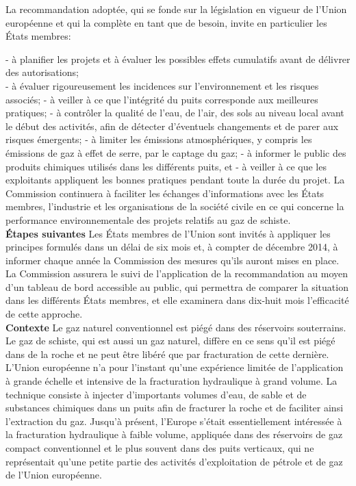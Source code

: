 \documentclass[8pt]{article}
\begin{document}
La recommandation adoptée, qui se fonde sur la législation en vigueur de l’Union européenne et qui la complète en tant que de besoin, invite en particulier les États membres: 

- à planifier les projets et à évaluer les possibles effets cumulatifs avant de délivrer des autorisations;\\
- à évaluer rigoureusement les incidences sur l’environnement et les risques associés;
- à veiller à ce que l’intégrité du puits corresponde aux meilleures pratiques;
- à contrôler la qualité de l’eau, de l’air, des sols au niveau local avant le début des activités, afin de détecter d'éventuels changements et de parer aux risques émergents;
- à limiter les émissions atmosphériques, y compris les émissions de gaz à effet de serre, par le captage du gaz;
- à informer le public des produits chimiques utilisés dans les différents puits, et
- à veiller à ce que les exploitants appliquent les bonnes pratiques pendant toute la durée du projet.
La Commission continuera à faciliter les échanges d'informations avec les États membres, l’industrie et les organisations de la société civile en ce qui concerne la performance environnementale des projets relatifs au gaz de schiste. \\

\textbf{Étapes suivantes}
Les États membres de l’Union sont invités à appliquer les principes formulés dans un délai de six mois et, à compter de décembre 2014, à informer chaque année la Commission des mesures qu’ils auront mises en place. La Commission assurera le suivi de l'application de la recommandation au moyen d'un tableau de bord accessible au public, qui permettra de comparer la situation dans les différents États membres, et elle examinera dans dix-huit mois l'efficacité de cette approche. \\

\textbf{Contexte}
Le gaz naturel conventionnel est piégé dans des réservoirs souterrains. Le gaz de schiste, qui est aussi un gaz naturel, diffère en ce sens qu'il est piégé dans de la roche et ne peut être libéré que par fracturation de cette dernière. L'Union européenne n'a pour l'instant qu'une expérience limitée de l'application à grande échelle et intensive de la fracturation hydraulique à grand volume. La technique consiste à injecter d’importants volumes d’eau, de sable et de substances chimiques dans un puits afin de fracturer la roche et de faciliter ainsi l’extraction du gaz. Jusqu'à présent, l'Europe s'était essentiellement intéressée à la fracturation hydraulique à faible volume, appliquée dans des réservoirs de gaz compact conventionnel et le plus souvent dans des puits verticaux, qui ne représentait qu'une petite partie des activités d'exploitation de pétrole et de gaz de l'Union européenne. \\
\end{document}
